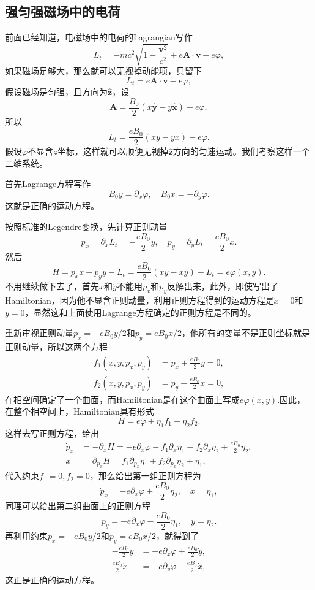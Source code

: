 \subsection*{强匀强磁场中的电荷}
前面已经知道，电磁场中的电荷的Lagrangian写作
\[
	L_t=-mc^2\sqrt{1-\frac{\bm{v}^2}{c^2}}+e \bm{A}\cdot\bm{v}-e\varphi,
\]
如果磁场足够大，那么就可以无视掉动能项，只留下
\[
	L_t=e \bm{A}\cdot\bm{v}-e\varphi,
\]
假设磁场是匀强，且方向为$\hat{\bm{z}}$，设
\[
	\bm{A}=\frac{B_0}{2}(x\hat{\bm{y}}-y\hat{\bm{x}})-e\varphi,
\]
所以
\[
	L_t=\frac{eB_0}{2} (x\dot{y}-y\dot{x})-e\varphi.
\]
假设$\varphi$不显含$z$坐标，这样就可以顺便无视掉$\hat{\bm{z}}$方向的匀速运动。我们考察这样一个二维系统。

首先Lagrange方程写作
\[
	B_0 \dot{y}=\partial_x \varphi,\quad B_0 \dot{x}=-\partial_y \varphi.
\]
这就是正确的运动方程。

按照标准的Legendre变换，先计算正则动量
\[
	p_x=\partial_{\dot{x}}L_t=-\frac{eB_0}{2}y,\quad p_y=\partial_{\dot{y}}L_t=\frac{eB_0}{2}x.
\]
然后
\[
	H=p_x\dot{x}+p_y\dot{y}-L_t=\frac{eB_0}{2}(x\dot{y}-\dot{x}y)-L_t=e\varphi(x,y).
\]
不用继续做下去了，首先$\dot{x}$和$\dot{y}$不能用$p_x$和$p_y$反解出来，此外，即使写出了Hamiltonian，因为他不显含正则动量，利用正则方程得到的运动方程是$\dot{x}=0$和$\dot{y}=0$，显然这和上面使用Lagrange方程确定的正则方程是不同的。

重新审视正则动量$p_x=-eB_0y/2$和$p_y=eB_0x/2$，他所有的变量不是正则坐标就是正则动量，所以这两个方程
\begin{align*}
	f_1(x,y,p_x,p_y)&=p_x+\frac{eB_0}{2}y=0,\\
	f_2(x,y,p_x,p_y)&=p_y-\frac{eB_0}{2}x=0,
\end{align*}
在相空间确定了一个曲面，而Hamiltonian是在这个曲面上写成$e\varphi(x,y)$.因此，在整个相空间上，Hamiltonian具有形式
\[
	H=e\varphi+\eta_1 f_1+\eta_2 f_2.
\]
这样去写正则方程，给出
\begin{align*}
	\dot{p}_x&=-\partial_x H=-e\partial_x \varphi-f_1\partial_x\eta_1-f_2\partial_x\eta_2+\frac{eB_0}{2}\eta_2,\\
	\dot{x}&=\partial_{p_x} H=f_1\partial_{p_x}\eta_1+f_2\partial_{p_x}\eta_2+\eta_1,
\end{align*}
代入约束$f_1=0, f_2=0$，那么给出第一组正则方程为
\[
	\dot{p}_x=-e\partial_x \varphi+\frac{eB_0}{2}\eta_2,\quad \dot{x}=\eta_1,
\]
同理可以给出第二组曲面上的正则方程
\[
	\dot{p}_y=-e\partial_x \varphi-\frac{eB_0}{2}\eta_1,\quad \dot{y}=\eta_2.
\]
再利用约束$p_x=-eB_0y/2$和$p_y=eB_0x/2$，就得到了
\begin{align*}
	-\frac{eB_0}{2}\dot{y}&=-e\partial_x \varphi+\frac{eB_0}{2}\dot{y},\\
	\frac{eB_0}{2}\dot{x}&=-e\partial_y \varphi-\frac{eB_0}{2}\dot{x},
\end{align*}
这正是正确的运动方程。
